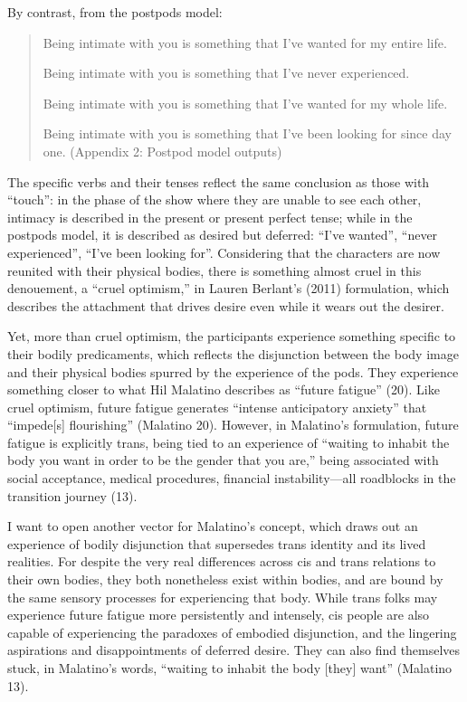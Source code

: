 \documentclass[11pt]{article}
\begin{document}
By contrast, from the postpods model:

\begin{quote}
Being intimate with you is something that I’ve wanted for my entire
life.

Being intimate with you is something that I’ve never experienced.

Being intimate with you is something that I’ve wanted for my whole
life.

Being intimate with you is something that I’ve been looking for since
day one. (Appendix 2: Postpod model outputs)
\end{quote}

The specific verbs and their tenses reflect the same conclusion as
those with “touch”: in the phase of the show where they are unable to
see each other, intimacy is described in the present or present
perfect tense; while in the postpods model, it is described as desired
but deferred: “I’ve wanted”, “never experienced”, “I’ve been looking
for”. Considering that the characters are now reunited with their
physical bodies, there is something almost cruel in this denouement, a
“cruel optimism,” in Lauren Berlant’s (2011) formulation, which
describes the attachment that drives desire even while it wears out
the desirer.

Yet, more than cruel optimism, the participants experience something
specific to their bodily predicaments, which reflects the disjunction
between the body image and their physical bodies spurred by the
experience of the pods. They experience something closer to what Hil
Malatino describes as “future fatigue” (20). Like cruel optimism,
future fatigue generates “intense anticipatory anxiety” that
“impede[s] flourishing” (Malatino 20). However, in Malatino’s
formulation, future fatigue is explicitly trans, being tied to an
experience of “waiting to inhabit the body you want in order to be the
gender that you are,” being associated with social acceptance, medical
procedures, financial instability—all roadblocks in the transition
journey (13).

I want to open another vector for Malatino’s concept, which draws out
an experience of bodily disjunction that supersedes trans identity and
its lived realities. For despite the very real differences across cis
and trans relations to their own bodies, they both nonetheless exist
within bodies, and are bound by the same sensory processes for
experiencing that body. While trans folks may experience future
fatigue more persistently and intensely, cis people are also capable
of experiencing the paradoxes of embodied disjunction, and the
lingering aspirations and disappointments of deferred desire. They can
also find themselves stuck, in Malatino’s words, “waiting to inhabit
the body [they] want” (Malatino 13).
\end{document}
